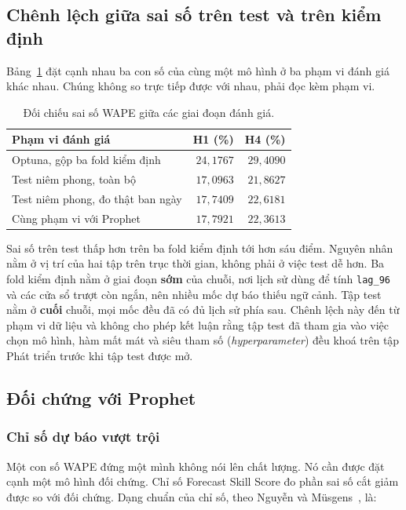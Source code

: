 \documentclass[12pt, a4paper]{report}
\begin{document}
\FloatBarrier
\subsection{Chênh lệch giữa sai số trên test và trên kiểm định}

Bảng~\ref{tab:ba_pham_vi} đặt cạnh nhau ba con số của cùng một mô hình ở ba phạm vi đánh giá
khác nhau. Chúng không so trực tiếp được với nhau, phải đọc kèm phạm vi.

\begin{table}[htbp]
\centering
\caption{Đối chiếu sai số WAPE giữa các giai đoạn đánh giá.}
\label{tab:ba_pham_vi}
\small
\begin{tabular}{l r r}
\toprule
\textbf{Phạm vi đánh giá} & \textbf{H1 (\%)} & \textbf{H4 (\%)} \\
\midrule
Optuna, gộp ba fold kiểm định   & $24{,}1767$ & $29{,}4090$ \\
Test niêm phong, toàn bộ        & $17{,}0963$ & $21{,}8627$ \\
Test niêm phong, đo thật ban ngày & $17{,}7409$ & $22{,}6181$ \\
Cùng phạm vi với Prophet        & $17{,}7921$ & $22{,}3613$ \\
\bottomrule
\end{tabular}
\end{table}

Sai số trên test thấp hơn trên ba fold kiểm định tới hơn sáu điểm. Nguyên nhân nằm ở vị trí của
hai tập trên trục thời gian, không phải ở việc test dễ hơn. Ba fold kiểm định nằm ở giai đoạn
\textbf{sớm} của chuỗi, nơi lịch sử dùng để tính \texttt{lag\_96} và các cửa sổ trượt còn ngắn, nên
nhiều mốc dự báo thiếu ngữ cảnh. Tập test nằm ở \textbf{cuối} chuỗi, mọi mốc đều đã có đủ lịch
sử phía sau. Chênh lệch này đến từ phạm vi dữ liệu và không cho phép kết luận rằng tập test đã
tham gia vào việc chọn mô hình, hàm mất mát và siêu tham số (\textit{hyperparameter}) đều khoá trên tập Phát triển
trước khi tập test được mở.

\FloatBarrier
\subsection{Đối chứng với Prophet}

\subsubsection{Chỉ số dự báo vượt trội}

Một con số WAPE đứng một mình không nói lên chất lượng. Nó cần được đặt cạnh một mô hình đối
chứng. Chỉ số Forecast Skill Score đo phần sai số cắt giảm được so với đối chứng. Dạng chuẩn của
chỉ số, theo Nguyễn và Müsgens~\cite{nguyen2026meta}, là:
\end{document}
